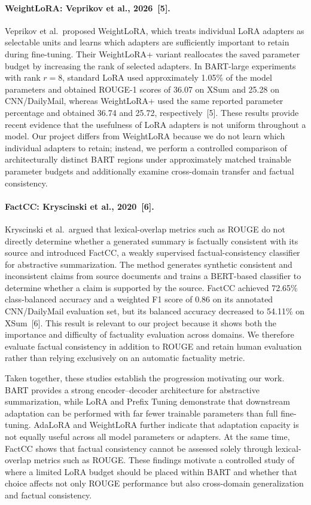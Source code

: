 \documentclass[11pt, letterpaper]{article}
\begin{document}
\paragraph{WeightLoRA: Veprikov et al., 2026~[5].}
Veprikov et al.\ proposed WeightLoRA, which treats individual LoRA adapters
as selectable units and learns which adapters are sufficiently important to
retain during fine-tuning. Their WeightLoRA+ variant reallocates the saved
parameter budget by increasing the rank of selected adapters. In BART-large
experiments with rank $r=8$, standard LoRA used approximately 1.05\% of the
model parameters and obtained ROUGE-1 scores of 36.07 on XSum and 25.28 on
CNN/DailyMail, whereas WeightLoRA+ used the same reported parameter percentage
and obtained 36.74 and 25.72, respectively~[5]. These results provide recent
evidence that the usefulness of LoRA adapters is not uniform throughout a
model. Our project differs from WeightLoRA because we do not learn which
individual adapters to retain; instead, we perform a controlled comparison of
architecturally distinct BART regions under approximately matched trainable
parameter budgets and additionally examine cross-domain transfer and factual
consistency.


\paragraph{FactCC: Kryscinski et al., 2020~[6].}
Kryscinski et al.\ argued that lexical-overlap metrics such as ROUGE do not
directly determine whether a generated summary is factually consistent with
its source and introduced FactCC, a weakly supervised factual-consistency
classifier for abstractive summarization. The method generates synthetic
consistent and inconsistent claims from source documents and trains a
BERT-based classifier to determine whether a claim is supported by the
source. FactCC achieved 72.65\% class-balanced accuracy and a weighted F1 score of
0.86 on its annotated CNN/DailyMail evaluation set, but its balanced
accuracy decreased to 54.11\% on XSum~[6]. This result is relevant to our
project because it shows both the importance and difficulty of factuality
evaluation across domains. We therefore evaluate factual consistency in
addition to ROUGE and retain human evaluation rather than relying exclusively
on an automatic factuality metric.


Taken together, these studies establish the progression motivating our work.
BART provides a strong encoder--decoder architecture for abstractive
summarization, while LoRA and Prefix Tuning demonstrate that downstream
adaptation can be performed with far fewer trainable parameters than full
fine-tuning. AdaLoRA and WeightLoRA further indicate that adaptation capacity
is not equally useful across all model parameters or adapters. At the same
time, FactCC shows that factual consistency cannot be assessed solely through
lexical-overlap metrics such as ROUGE. These findings motivate a controlled
study of where a limited LoRA budget should be placed within BART and whether
that choice affects not only ROUGE performance but also cross-domain
generalization and factual consistency.
\end{document}
